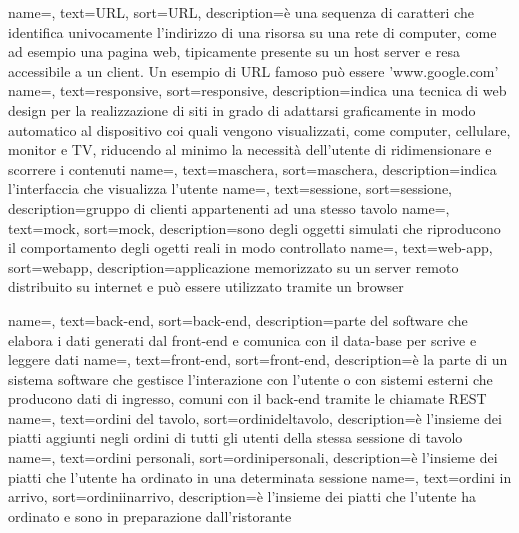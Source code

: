 {
    name=,
    text=URL,
    sort=URL,
    description={è una sequenza di caratteri che identifica univocamente l'indirizzo di una risorsa su una rete di computer, come ad esempio una pagina web, tipicamente presente su un host server e resa accessibile a un client. Un esempio di URL famoso può essere 'www.google.com'}
}
{
    name=,
    text=responsive,
    sort=responsive,
    description={indica una tecnica di web design per la realizzazione di siti in grado di adattarsi graficamente in modo automatico al dispositivo coi quali vengono visualizzati, come computer, cellulare, monitor e TV, riducendo al minimo la necessità dell'utente di ridimensionare e scorrere i contenuti}
}
{
    name=,
    text=maschera,
    sort=maschera,
    description={indica l'interfaccia che visualizza l'utente}
}
{
    name=,
    text=sessione,
    sort=sessione,
    description={gruppo di clienti appartenenti ad una stesso tavolo}
}
{
    name=,
    text=mock,
    sort=mock,
    description={sono degli oggetti simulati che riproducono il comportamento degli ogetti reali in modo controllato}
}
{
    name=,
    text=web-app,
    sort=webapp,
    description={applicazione memorizzato su un server remoto distribuito su internet e può essere utilizzato tramite un browser}
}

{
    name=,
    text=back-end,
    sort=back-end,
    description={parte del software che elabora i dati generati dal front-end e comunica con il data-base per scrive e leggere dati}
}
{
    name=,
    text=front-end,
    sort=front-end,
    description={è la parte di un sistema software che gestisce l'interazione con l'utente o con sistemi esterni che producono dati di ingresso, comuni con il back-end tramite le chiamate REST}
}
{
    name=,
    text=ordini del tavolo,
    sort=ordinideltavolo,
    description={è l'insieme dei piatti aggiunti negli ordini di tutti gli utenti della stessa sessione di tavolo}
}
{
    name=,
    text=ordini personali,
    sort=ordinipersonali,
    description={è l'insieme dei piatti che l'utente ha ordinato in una determinata sessione}
}
{
    name=,
    text=ordini in arrivo,
    sort=ordiniinarrivo,
    description={è l'insieme dei piatti che l'utente ha ordinato e sono in preparazione dall'ristorante}
}

